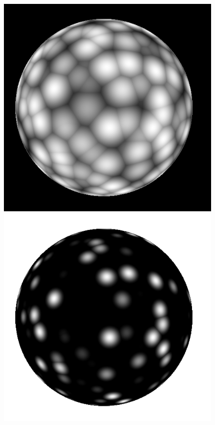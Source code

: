 \begin{figure}[H]
    \begin{center}
    \includegraphics[scale=0.3]{images/noise/worley3d_thresh_1.png}
    \includegraphics[scale=0.3]{images/noise/worley3d_thresh_2.png}

\end{center}
\end{figure}
